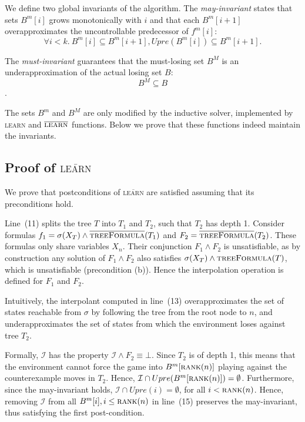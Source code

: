 \documentclass{llncs}
\newcommand{\II}{\mathcal{I}}
\newcommand{\textoverline}[1]{$\overline{\mbox{#1}}$}
\begin{document}
We define two global invariants of the algorithm.  The \emph{may-invariant}
states that sets $B^m[i]$ grows monotonically with $i$ and that each $B^m[i+1]$
overapproximates the uncontrollable predecessor of $f^m[i]$: $$\forall
i<k.~B^m[i] \subseteq B^m[i+1], Upre(B^m[i]) \subseteq B^m[i+1].$$

The \emph{must-invariant} guarantees that the must-losing set $B^M$ is an
underapproximation of the actual losing set $B$: $$B^M \subseteq B$$.

The sets $B^m$ and $B^M$ are only modified by the inductive solver, implemented
by \textsc{learn} and \textoverline{\textsc{learn}} functions.  Below we prove that these
functions indeed maintain the invariants.

\subsection{Proof of \textsc{\textoverline{learn}}}

We prove that postconditions of \textsc{\textoverline{learn}} are satisfied
assuming that its preconditions hold.

Line~(11) splits the tree $T$ into $T_1$ and $T_2$, such that $T_2$ has depth
1.  Consider formulas $f_1=\sigma(X_T) \land
\textsc{\textoverline{treeFormula}}(T_1)$ and $F_2 =
\textsc{\textoverline{treeFormula}}(T_2)$.  These formulas only share variables
$X_n$.  Their conjunction $F_1 \land F_2$ is unsatisfiable, as by construction
any solution of $F_1 \land F_2$ also satisfies $\sigma(X_T) \land
\textsc{treeFormula}(T)$, which is unsatisfiable (precondition (b)).  Hence the
interpolation operation is defined for $F_1$ and $F_2$.  

Intuitively, the interpolant computed in line~(13) overapproximates the set of
states reachable from $\sigma$ by following the tree from the root node to $n$,
and underapproximates the set of states from which the environment loses
against tree $T_2$.  

Formally, $\II$ has the property $\II \land F_2 \equiv \bot$.  Since $T_2$ is
of depth 1, this means that the environment cannot force the game into
$B^m[\textsc{rank}(n)]$ playing against the counterexample moves in $T_2$.
Hence, $\II \cap Upre(B^m[\textsc{rank}(n)]) = \emptyset$.  Furthermore, since
the may-invariant holds, $\II \cap Upre(i) = \emptyset$, for all $i <
\textsc{rank}(n)$.  Hence, removing $\II$ from all $B^m[i], i\leq
\textsc{rank}(n)$ in line~(15) preserves the may-invariant, thus satisfying the
first post-condition.
\end{document}
